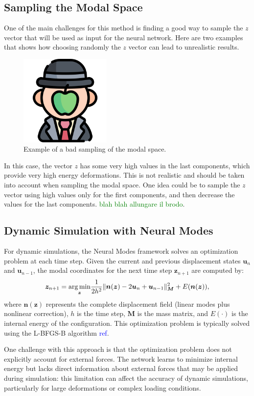 \subsection{Sampling the Modal Space}
One of the main challenges for this method is finding a good way to sample the \(z\) vector that will be used as input for the neural network. Here are two examples that shows how choosing randomly the \(z\) vector can lead to unrealistic results. 
\begin{figure}[H]
    \centering
    \includegraphics[width=0.4\textwidth]{Images/dummy.png}
    \caption{Example of a bad sampling of the modal space.}
    \label{fig:bad_sampling}
\end{figure}
In this case, the vector \(z\) has some very high values in the last components, which provide very high energy deformations. This is not realistic and should be taken into account when sampling the modal space. One idea could be to sample the \(z\) vector using high values only for the first components, and then decrease the values for the last components. \textcolor{green}{blah blah allungare il brodo}.



\subsection{Dynamic Simulation with Neural Modes}
For dynamic simulations, the Neural Modes framework solves an optimization problem at each time step. Given the current and previous displacement states $\bm{u}_n$ and $\bm{u}_{n-1}$, the modal coordinates for the next time step $\bm{z}_{n+1}$ are computed by:
\begin{equation}
    \bm{z}_{n+1} = \underset{\bm{z}}{\operatorname*{arg\,min}} \frac{1}{2h^2} \|\bm{n}(\bm{z}) - 2\bm{u}_n + \bm{u}_{n-1}\|_{\bm{M}}^2 + E(\bm{n}(\bm{z})),
\end{equation}
where $\bm{n}(\bm{z})$ represents the complete displacement field (linear modes plus nonlinear correction), $h$ is the time step, $\bm{M}$ is the mass matrix, and $E(\cdot)$ is the internal energy of the configuration. This optimization problem is typically solved using the L-BFGS-B algorithm \textcolor{blue}{ref}.

One challenge with this approach is that the optimization problem does not explicitly account for external forces. The network learns to minimize internal energy but lacks direct information about external forces that may be applied during simulation: this limitation can affect the accuracy of dynamic simulations, particularly for large deformations or complex loading conditions.



